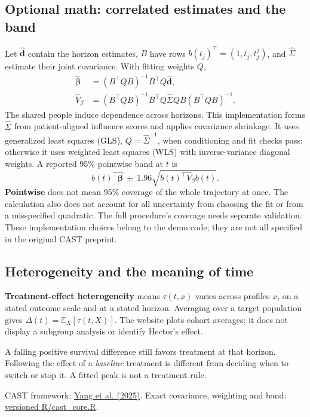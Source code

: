 \documentclass[11pt,letterpaper]{article}
\newcommand{\E}{\mathbb{E}}
\newcommand{\term}[1]{\textbf{\color{ink}#1}}
\newcommand{\source}[1]{{\small\color{muted}#1}}
\begin{document}
\subsection{Optional math: correlated estimates and the band}
Let $\widehat{\boldsymbol d}$ contain the horizon estimates, $B$ have rows
$b(t_j)^\top=(1,t_j,t_j^2)$, and $\widehat\Sigma$ estimate their joint
covariance. With fitting weights $Q$,
\begin{align*}
 \widehat{\boldsymbol\beta}
   &=(B^\top QB)^{-1}B^\top Q\widehat{\boldsymbol d},\\
 \widehat V_\beta
   &=(B^\top QB)^{-1}B^\top Q\widehat\Sigma QB(B^\top QB)^{-1}.
\end{align*}
The shared people induce dependence across horizons. This implementation
forms $\widehat\Sigma$ from patient-aligned influence scores and applies
covariance shrinkage. It uses generalized least squares (GLS),
$Q=\widehat\Sigma^{-1}$, when conditioning and fit checks pass; otherwise it
uses weighted least squares (WLS) with inverse-variance diagonal weights.
A reported 95\% pointwise band at $t$ is
\[
 b(t)^\top\widehat{\boldsymbol\beta}\ \pm\
 1.96\sqrt{b(t)^\top\widehat V_\beta b(t)}.
\]
\term{Pointwise} does not mean 95\% coverage of the whole trajectory at once.
The calculation also does not account for all uncertainty from choosing the
fit or from a misspecified quadratic. The full procedure's coverage needs
separate validation. These implementation choices belong to the demo code;
they are not all specified in the original CAST preprint.

\subsection{Heterogeneity and the meaning of time}
\term{Treatment-effect heterogeneity} means $\tau(t,x)$ varies across profiles
$x$, on a stated outcome scale and at a stated horizon. Averaging over a
target population gives $\Delta(t)=\E_X[\tau(t,X)]$. The website plots cohort
averages; it does not display a subgroup analysis or identify Hector's effect.

A falling positive survival difference still favors treatment at that horizon.
Following the effect of a \emph{baseline} treatment is different from deciding
when to switch or stop it. A fitted peak is not a treatment rule.

\source{CAST framework: \href{https://arxiv.org/abs/2505.06367}{Yang et al. (2025)}.
Exact covariance, weighting and band:
\href{https://github.com/ishuryak/cast_demo_website/blob/43a00101100801eb6c048800d24788455fac0f8b/R/cast_core.R}{versioned R/cast\_core.R}.}
\end{document}
